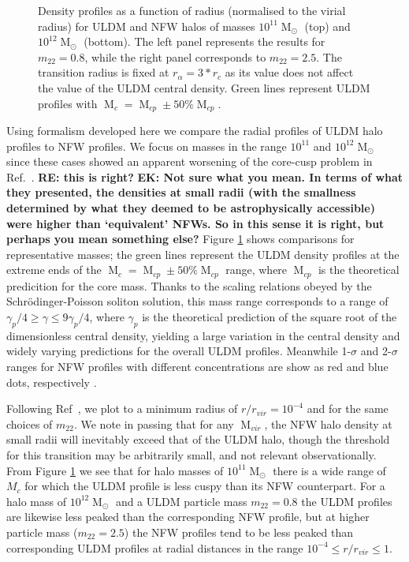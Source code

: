 \documentclass[a4paper,11pt]{article}
\newcommand{\ek}[1]{{{\bf \color{red} EK: #1}}}
\newcommand{\re}[1]{{{\bf \color{green} RE: #1}}}
\begin{document}
\begin{figure}
\begin{tabular}{cc}
\end{tabular}
\caption{Density profiles as a function of radius (normalised to the virial radius) for ULDM and NFW halos of masses $10^{11}\operatorname{M}_{\odot}$ (top) and $10^{12}\operatorname{M}_{\odot}$ (bottom). The left panel represents the results for $m_{22} = 0.8$, while the right panel corresponds to $m_{22}=2.5$. The transition radius is fixed at $r_{\alpha} = 3*r_c$ as its value does not affect the value of the ULDM central density. Green lines represent  ULDM profiles with $\operatorname{M}_c = \operatorname{M}_{cp} \pm 50 \% \operatorname{M}_{cp}$.}\label{fig:profiles}
\end{figure}

 
Using formalism developed here we compare the radial profiles of ULDM halo profiles to NFW profiles. We focus on masses in the range $10^{11}$ and $10^{12} \operatorname{M}_{\odot}$ since these cases showed an apparent worsening of the core-cusp problem in Ref.~\cite{Robles:2018fur}. \re{ this is right?}\ek{Not sure what you mean. In terms of what they presented, the densities at small radii (with the smallness determined by what they deemed to be astrophysically accessible) were higher than `equivalent' NFWs. So in this sense it is right, but perhaps you mean something else?} Figure \ref{fig:profiles} shows comparisons for representative masses; the green lines represent the ULDM density profiles at the extreme ends of the $\operatorname{M}_c = \operatorname{M}_{cp} \pm 50 \% \operatorname{M}_{cp}$ range, where $\operatorname{M}_{cp}$ is the theoretical predicition for the core mass. Thanks to the scaling relations obeyed by the Schr{\"o}dinger-Poisson soliton solution, this mass range corresponds to a range of $ \gamma_p /4 \geq \gamma \leq 9\gamma_p/4$, where $\gamma_p$ is the theoretical prediction of the square root of the dimensionless central density, yielding a large variation in the central density and widely varying predictions for the overall ULDM profiles. Meanwhile  1-$\sigma$ and 2-$\sigma$ ranges for NFW profiles with different concentrations are show as red and blue dots, respectively \cite{Maccio:2008pcd}. 

Following Ref~\cite{Robles:2018fur}, we plot to a minimum radius of $r/r_{vir} = 10^{-4}$ and for the same choices of $m_{22}$. We note in passing that for any $\operatorname{M}_{vir}$, the NFW halo density at small radii will inevitably exceed that of the ULDM halo, though the threshold for this transition may be arbitrarily small, and not relevant observationally.  From Figure \ref{fig:profiles} we see that for halo masses of $10^{11}\operatorname{M}_{\odot}$ there is a wide range of $M_c$ for which the ULDM profile is less cuspy than its NFW counterpart.  For a halo mass of $10^{12}\operatorname{M}_{\odot}$ and a ULDM particle mass $m_{22}=0.8$ the ULDM profiles are likewise less peaked than the corresponding NFW profile, but at higher particle mass ($m_{22}=2.5$) the  NFW profiles tend to be less peaked than corresponding ULDM profiles at radial distances in  the range $10^{-4}\leq r/r_{vir} \leq 1$.
\end{document}
